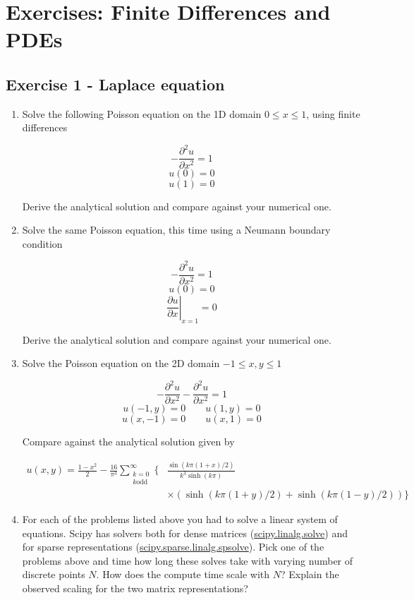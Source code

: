 \documentclass[a4paper]{article}
\begin{document}
\section*{Exercises: Finite Differences and PDEs}

\vspace{0,75cm}

\subsection*{Exercise 1 - Laplace equation}

\begin{enumerate}[label=\alph*.]
\item Solve the following Poisson equation on the 1D domain $0 \le x \le 1$, using
  finite differences

  $$-\frac{\partial^2 u}{\partial x^2} = 1$$ 
  $$u(0) = 0$$ 
  $$u(1) = 0$$ 

  Derive the analytical solution and compare against your numerical one.

\item Solve the same Poisson equation, this time using a Neumann boundary condition

  $$-\frac{\partial^2 u}{\partial x^2} = 1$$ 
  $$u(0) = 0$$ 
  $$\left. \frac{\partial u}{\partial x} \right|_{x=1} = 0$$ 

  Derive the analytical solution and compare against your numerical one.

\item Solve the Poisson equation on the 2D domain $-1 \le x,y \le 1$

  $$-\frac{\partial^2 u}{\partial x^2} -\frac{\partial^2 u}{\partial x^2} = 1$$ 
  $$u(-1, y) = 0 \qquad u( 1, y) = 0$$ 
  $$u( x,-1) = 0 \qquad u( x, 1) = 0$$ 

  Compare against the analytical solution given by

  \begin{align}
    u(x,y) = \frac{1-x^2}{2} - \frac{16}{\pi^3} \sum_{\substack{k=0 \\ k\text{
      odd}}}^\infty \biggl\{ 
      &\frac{\sin(k\pi(1+x)/2)}{k^3\sinh(k\pi)} \\
      &\times (\sinh(k\pi(1+y)/2) + \sinh(k\pi(1-y)/2)) 
      \biggr\}
  \end{align}

\item  For each of the problems listed above you had to solve a linear system of
  equations. Scipy has solvers both for dense matrices
    (\href{https://docs.scipy.org/doc/scipy/reference/generated/scipy.linalg.solve.html}{scipy.linalg.solve})
    and for sparse representations
    (\href{https://docs.scipy.org/doc/scipy/reference/generated/scipy.sparse.linalg.spsolve.html#scipy.sparse.linalg.spsolve}{scipy.sparse.linalg.spsolve}).
    Pick one of the problems above and time how long these solves take with varying
    number of discrete points $N$. How does the compute time scale with $N$? Explain the
observed scaling for the two matrix representations?  \end{enumerate}
\end{document}

